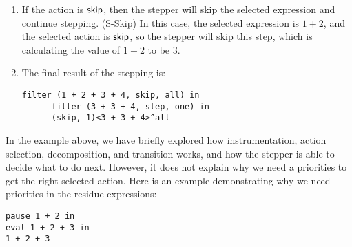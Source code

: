 \begin{enumerate}
  \item If the action is \(\mathsf{skip}\), then the stepper will skip the selected expression and continue stepping. (S-Skip) In this case, the selected expression is \(1 + 2\), and the selected action is \(\mathsf{skip}\), so the stepper will skip this step, which is calculating the value of \(1 + 2\) to be \(3\).

  \item The final result of the stepping is:
    \begin{lstlisting}[language=hazel]
      filter (1 + 2 + 3 + 4, skip, all) in
      filter (3 + 3 + 4, step, one) in
      (skip, 1)<3 + 3 + 4>^all
    \end{lstlisting}
\end{enumerate}

In the example above, we have briefly explored how instrumentation, action selection,  decomposition, and transition works, and how the stepper is able to decide what to do next. However, it does not explain why we need a priorities to get the right selected action. Here is an example demonstrating why we need priorities in the residue expressions:
\begin{lstlisting}[language=hazel]
pause 1 + 2 in
eval 1 + 2 + 3 in
1 + 2 + 3
\end{lstlisting}

